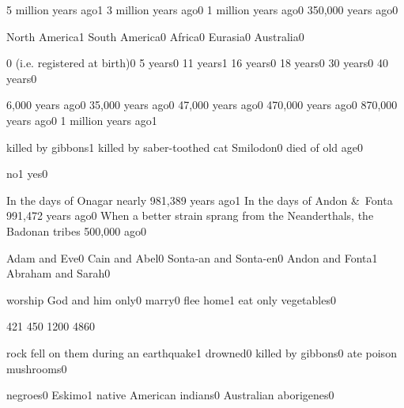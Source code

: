 {5 million years ago}{1}
{3 million years ago}{0}
{1 million years ago}{0}
{350,000 years ago}{0}
\qstop

{North America}{1}
{South America}{0}
{Africa}{0}
{Eurasia}{0}
{Australia}{0}
\qstop

{0 (i.e. registered at birth)}{0}
{5 years}{0}
{11 years}{1}
{16 years}{0}
{18 years}{0}
{30 years}{0}
{40 years}{0}
\qstop


{6,000 years ago}{0}
{35,000 years ago}{0}
{47,000 years ago}{0}
{470,000 years ago}{0}
{870,000 years ago}{0}
{1 million years ago}{1}
\qstop

{killed by gibbons}{1}
{killed by saber-toothed cat Smilodon}{0}
{died of old age}{0}
\qstop

{no}{1}
{yes}{0}
\qstop


{In the days of Onagar nearly 981,389 years ago}{1}
{In the days of Andon \&\ Fonta 991,472 years ago}{0}
{When a better strain sprang from the Neanderthals, the Badonan tribes 500,000 ago}{0}
\qstop

{Adam and Eve}{0}
{Cain and Abel}{0}
{Sonta\hyp{}an and Sonta\hyp{}en}{0}
{Andon and Fonta}{1}
{Abraham and Sarah}{0}
\qstop

{worship God and him only}{0}
{marry}{0}
{flee home}{1}
{eat only vegetables}{0}
\qstop

{42}{1}
{45}{0}
{120}{0}
{486}{0}
\qstop

{rock fell on them during an earthquake}{1}
{drowned}{0}
{killed by gibbons}{0}
{ate poison mushrooms}{0}
\qstop

{negroes}{0}
{Eskimo}{1}
{native American indians}{0}
{Australian aborigenes}{0}
\qstop

